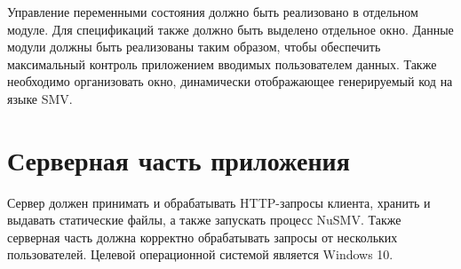 Управление переменными состояния должно быть реализовано в отдельном модуле. Для спецификаций также должно быть выделено отдельное окно. Данные модули должны быть реализованы таким образом, чтобы обеспечить максимальный контроль приложением вводимых пользователем данных. Также необходимо организовать окно, динамически отображающее генерируемый код на языке SMV.

\section{Серверная часть приложения}

Сервер должен принимать и обрабатывать HTTP-запросы клиента, хранить и выдавать статические файлы, а также запускать процесс NuSMV. Также серверная часть должна корректно обрабатывать запросы от нескольких пользователей. Целевой операционной системой является Windows 10.

